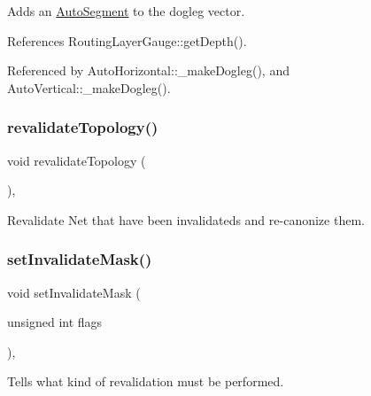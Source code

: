 Adds an \hyperlink{classKatabatic_1_1AutoSegment}{Auto\+Segment} to the dogleg vector. 

References Routing\+Layer\+Gauge\+::get\+Depth().



Referenced by Auto\+Horizontal\+::\+\_\+make\+Dogleg(), and Auto\+Vertical\+::\+\_\+make\+Dogleg().

\mbox{\label{classKatabatic_1_1Session_a69fc41ca90fae86766ae9d528394868f}} 
\subsubsection{\texorpdfstring{revalidate\+Topology()}{revalidateTopology()}}
{\footnotesize\ttfamily void revalidate\+Topology (\begin{DoxyParamCaption}{ }\end{DoxyParamCaption})\hspace{0.3cm}{\ttfamily [inline]}, {\ttfamily [static]}}

Revalidate Net that have been invalidateds and re-\/canonize them. \mbox{\label{classKatabatic_1_1Session_a16f4761496e07b9e836642d1effa1993}} 
\subsubsection{\texorpdfstring{set\+Invalidate\+Mask()}{setInvalidateMask()}}
{\footnotesize\ttfamily void set\+Invalidate\+Mask (\begin{DoxyParamCaption}\item[{unsigned int}]{flags }\end{DoxyParamCaption})\hspace{0.3cm}{\ttfamily [inline]}, {\ttfamily [static]}}

Tells what kind of revalidation must be performed. \mbox{\label{classKatabatic_1_1Session_ae310a7c2c301b7e5f90fba5d34cc5be9}} 
